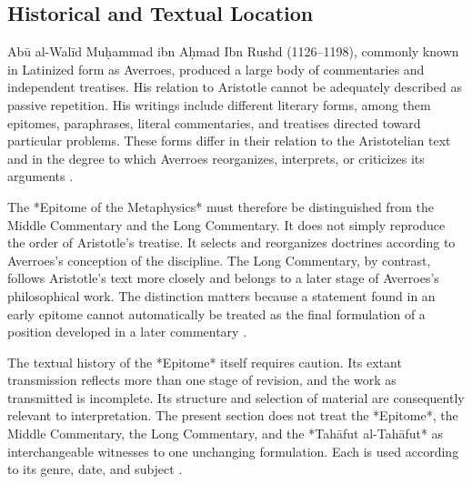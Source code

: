 
\subsection{Historical and Textual Location}
\label{subsec:ch08_s15_ss02}

\label{para:VS.B01.P01.C08.S15.SS02.P001}

Abū al-Walīd Muḥammad ibn Aḥmad Ibn Rushd (1126–1198), commonly
known in Latinized form as Averroes, produced a large body of
commentaries and independent treatises. His relation to Aristotle
cannot be adequately described as passive repetition. His writings
include different literary forms, among them epitomes, paraphrases,
literal commentaries, and treatises directed toward particular
problems. These forms differ in their relation to the Aristotelian
text and in the degree to which Averroes reorganizes, interprets,
or criticizes its arguments
\citep{BenAhmedPasnauIbnRushdSEP2025}.

\label{para:VS.B01.P01.C08.S15.SS02.P002}

The *Epitome of the Metaphysics* must therefore be distinguished
from the Middle Commentary and the Long Commentary. It does not
simply reproduce the order of Aristotle's treatise. It selects and
reorganizes doctrines according to Averroes's conception of the
discipline. The Long Commentary, by contrast, follows Aristotle's
text more closely and belongs to a later stage of Averroes's
philosophical work. The distinction matters because a statement
found in an early epitome cannot automatically be treated as the
final formulation of a position developed in a later commentary
\citep{AverroesEpitomeMetaphysicsArnzen2010,
AverroesLongCommentaryMetaphysicsBouyges1990}.

\label{para:VS.B01.P01.C08.S15.SS02.P003}

The textual history of the *Epitome* itself requires caution.
Its extant transmission reflects more than one stage of revision,
and the work as transmitted is incomplete. Its structure and
selection of material are consequently relevant to interpretation.
The present section does not treat the *Epitome*, the Middle
Commentary, the Long Commentary, and the *Tahāfut al-Tahāfut*
as interchangeable witnesses to one unchanging formulation.
Each is used according to its genre, date, and subject
\citep{AverroesEpitomeMetaphysicsArnzen2010,
BenAhmedPasnauIbnRushdSEP2025}.

